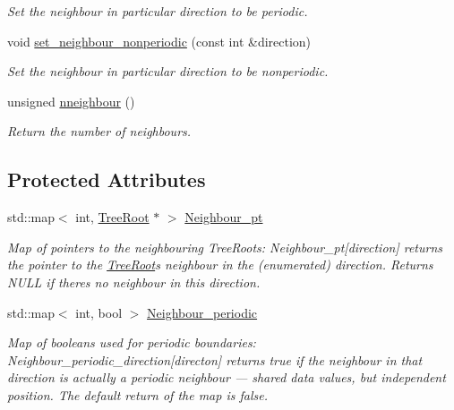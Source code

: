 \begin{DoxyCompactItemize}
\begin{DoxyCompactList}\small\item\em Set the neighbour in particular direction to be periodic. \end{DoxyCompactList}\item 
void \hyperlink{classoomph_1_1TreeRoot_a9e20f4787d7b34d5f4462dea63fd0204}{set\+\_\+neighbour\+\_\+nonperiodic} (const int \&direction)
\begin{DoxyCompactList}\small\item\em Set the neighbour in particular direction to be nonperiodic. \end{DoxyCompactList}\item 
unsigned \hyperlink{classoomph_1_1TreeRoot_a81be1a835829a48f7f443dcc85f369b9}{nneighbour} ()
\begin{DoxyCompactList}\small\item\em Return the number of neighbours. \end{DoxyCompactList}\end{DoxyCompactItemize}
\subsection*{Protected Attributes}
\begin{DoxyCompactItemize}
\item 
std\+::map$<$ int, \hyperlink{classoomph_1_1TreeRoot}{Tree\+Root} $\ast$ $>$ \hyperlink{classoomph_1_1TreeRoot_a01e5f3564f923fa92015c444d9f656bd}{Neighbour\+\_\+pt}
\begin{DoxyCompactList}\small\item\em Map of pointers to the neighbouring Tree\+Roots\+: Neighbour\+\_\+pt\mbox{[}direction\mbox{]} returns the pointer to the \hyperlink{classoomph_1_1TreeRoot}{Tree\+Root}\textquotesingle{}s neighbour in the (enumerated) direction. Returns N\+U\+LL if there\textquotesingle{}s no neighbour in this direction. \end{DoxyCompactList}\item 
std\+::map$<$ int, bool $>$ \hyperlink{classoomph_1_1TreeRoot_a735d46a67142786a3368d0e719513c03}{Neighbour\+\_\+periodic}
\begin{DoxyCompactList}\small\item\em Map of booleans used for periodic boundaries\+: Neighbour\+\_\+periodic\+\_\+direction\mbox{[}directon\mbox{]} returns true if the neighbour in that direction is actually a periodic neighbour --- shared data values, but independent position. The default return of the map is false. \end{DoxyCompactList}\end{DoxyCompactItemize}
